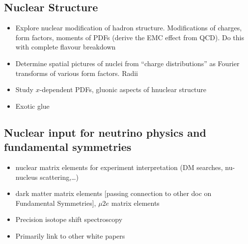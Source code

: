 \subsection{Nuclear Structure}
\label{sec:nuclearstructure}
\begin{itemize}
	\item Explore nuclear modification of hadron structure. Modifications of charges, form factors, moments of PDFs  (derive the EMC effect from QCD). 
	Do this with complete flavour breakdown
	\item Determine spatial pictures of nuclei from ``charge distributions'' as Fourier transforms of various form factors. Radii
	\item Study $x$-dependent PDFs, gluonic aspects of hnuclear structure
	\item Exotic glue
\end{itemize}



\subsection{Nuclear input for neutrino physics and fundamental symmetries}

\begin{itemize}
	\item nuclear matrix elements for experiment interpretation (DM searches, nu-nucleus scattering,…)
	\item dark matter matrix elements [passing connection to other doc on Fundamental Symmetries], $\mu 2e$ matrix elements
	\item Precision isotope shift spectroscopy 
	\item Primarily link to other white papers
\end{itemize}

